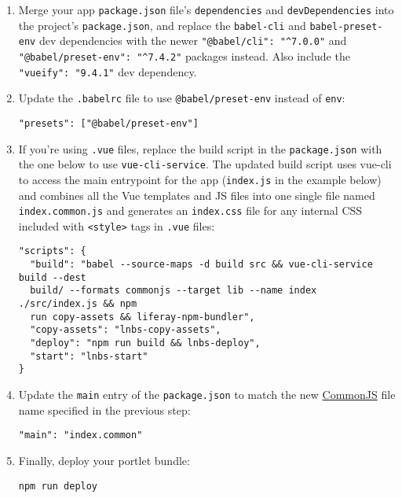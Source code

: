 \begin{enumerate}
\def\labelenumi{\arabic{enumi}.}
\setcounter{enumi}{6}
\item
  Merge your app \texttt{package.json} file's \texttt{dependencies} and
  \texttt{devDependencies} into the project's \texttt{package.json}, and
  replace the \texttt{babel-cli} and \texttt{babel-preset-env} dev
  dependencies with the newer \texttt{"@babel/cli":\ "\^{}7.0.0"} and
  \texttt{"@babel/preset-env":\ "\^{}7.4.2"} packages instead. Also
  include the \texttt{"vueify":\ "9.4.1"} dev dependency.
\item
  Update the \texttt{.babelrc} file to use \texttt{@babel/preset-env}
  instead of \texttt{env}:

\begin{verbatim}
"presets": ["@babel/preset-env"]
\end{verbatim}
\item
  If you're using \texttt{.vue} files, replace the build script in the
  \texttt{package.json} with the one below to use
  \texttt{vue-cli-service}. The updated build script uses vue-cli to
  access the main entrypoint for the app (\texttt{index.js} in the
  example below) and combines all the Vue templates and JS files into
  one single file named \texttt{index.common.js} and generates an
  \texttt{index.css} file for any internal CSS included with
  \texttt{\textless{}style\textgreater{}} tags in \texttt{.vue} files:

\begin{verbatim}
"scripts": {
  "build": "babel --source-maps -d build src && vue-cli-service build --dest 
  build/ --formats commonjs --target lib --name index ./src/index.js && npm 
  run copy-assets && liferay-npm-bundler",
  "copy-assets": "lnbs-copy-assets",
  "deploy": "npm run build && lnbs-deploy",
  "start": "lnbs-start"
}
\end{verbatim}
\item
  Update the \texttt{main} entry of the \texttt{package.json} to match
  the new \href{http://www.commonjs.org/}{CommonJS} file name specified
  in the previous step:

\begin{verbatim}
"main": "index.common"
\end{verbatim}
\item
  Finally, deploy your portlet bundle:

\begin{verbatim}
npm run deploy
\end{verbatim}
\end{enumerate}


